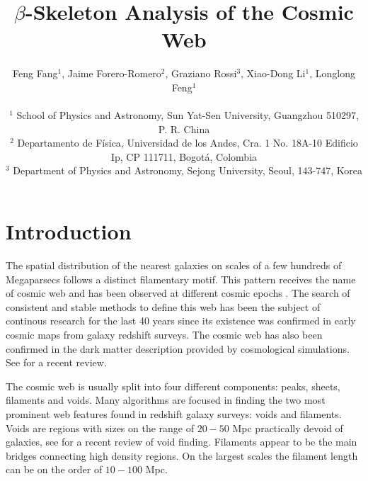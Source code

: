 \documentclass[useAMS,usenatbib]{mnras}
\begin{document}
\title[$\beta$-Skeleton Analysis]{$\beta$-Skeleton Analysis of the Cosmic Web}

\author[Fang, Forero-Romero, Rossi, Li \& Feng (2018)]
{Feng Fang$^1$, Jaime Forero-Romero$^2$, Graziano Rossi$^3$, Xiao-Dong Li$^1$, Longlong Feng$^1$ \\ \\
$^1$ School of Physics and Astronomy, Sun Yat-Sen University, Guangzhou 510297, P. R. China \\
$^2$ Departamento de F{\'i}sica, Universidad de los Andes, Cra. 1 No. 18A-10 Edificio Ip, CP 111711, Bogot{\'a}, Colombia \\
$^3$ Department of Physics and Astronomy, Sejong University, Seoul, 143-747, Korea}

\pagerange{\pageref{firstpage}--\pageref{lastpage}} 
\maketitle
\label{firstpage}


 

\section{Introduction}

The spatial distribution of the nearest galaxies on scales of a few
hundreds of Megaparsecs follows a distinct filamentary motif.
This pattern receives the name of cosmic web
\citep{1986ApJ...304...15B} and has been observed at
different cosmic epochs \citep{1986ApJ...302L...1D,
  2012ApJS..199...26H,2004ApJ...606..702T,2014A&A...566A.108G}.   
The search of consistent and stable methods to define this web has
been the subject of continous research for the last 40 years since its
existence was confirmed in early cosmic maps from galaxy redshift
surveys.
The cosmic web has also been confirmed in the dark matter description
provided by cosmological simulations.  
See \cite{2018MNRAS.473.1195L} for a recent review.


The cosmic web is usually split into four different components: peaks,
sheets, filaments and voids.
Many algorithms are focused in finding the two most prominent web features
found in redshift galaxy surveys: voids and filaments. 
Voids are regions with sizes on the range of $20-50$ Mpc
practically devoid of galaxies, see \cite{2016IAUS..308..493V} for a recent review of
void finding.
Filaments appear to be the main bridges connecting high
density regions. 
On the largest scales the filament length can be on the order of
$10-100$ Mpc.
\end{document}
